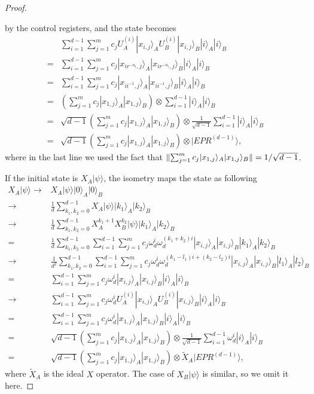 \documentclass[11pt,letterpaper]{article}
\newcommand{\ket}[1]{|#1\rangle}
\newcommand{\x}{\otimes}
\DeclarePairedDelimiter{\norm}{\lVert}{\rVert}
\newcommand{\1}{\mathbb{1}}
\newcommand{\EPR}[1]{EPR^{(#1)}}
\newcommand{\tX}{\tilde{X}}
\theoremstyle{definition}
\begin{document}
\begin{proof}
\begin{enumerate}
	by the control registers, and the state becomes
	\begin{align}
		&\sum_{i=1}^{d-1}\sum_{j=1}^m c_j U_A^{(i)}\ket{x_{i,j}}_A U_B^{(i)}\ket{x_{i,j}}_B \ket{i}_A\ket{i}_B \\
		=&\sum_{i=1}^{d-1} \sum_{j=1}^m c_j \ket{x_{i r^{-n_i} ,j}}_A \ket{x_{i r^{-n_i},j}}_B \ket{i}_A\ket{i}_B\\
		=& \sum_{i=1}^{d-1} \sum_{j=1}^m c_j \ket{x_{i i^{-1},j}}_A \ket{x_{i i^{-1},j}}_B \ket{i}_A\ket{i}_B\\
		= &\left(\sum_{j=1}^m c_j \ket{x_{1,j}}_A \ket{x_{1,j}}_B\right) \x \sum_{i=1}^{d-1} \ket{i}_A\ket{i}_B\\
		=&\sqrt{d-1} \left(\sum_{j=1}^m c_j \ket{x_{1,j}}_A \ket{x_{1,j}}_B\right) \x 
		\frac{1}{\sqrt{d-1}}\sum_{i=1}^{d-1}\ket{i}_A\ket{i}_B\\
		=&\sqrt{d-1} \left(\sum_{j=1}^m c_j \ket{x_{1,j}}_A \ket{x_{1,j}}_B\right) \x \ket{\EPR{d-1}},
	\end{align}
	where in the last line we used the fact that $\norm{\sum_{j=1}^m c_j \ket{x_{1,j}}_A \ket{x_{1,j}}_B} = 1/\sqrt{d-1}$.
\end{enumerate}

If the initial state is $X_A\ket{\psi}$, the isometry maps the state as following
\begin{align}
	X_A\ket{\psi} \to &X_A\ket{\psi}\ket{0}_A\ket{0}_B\\
	\to &\frac{1}{d} \sum_{k_1,k_2 =0}^{d-1} X_A\ket{\psi} \ket{k_1}_A \ket{k_2}_B \\
	\to &\frac{1}{d} \sum_{k_1,k_2 =0}^{d-1} X_A^{k_1+1} X_B^{k_2}\ket{\psi} \ket{k_1}_A \ket{k_2}_B \\
	=&\frac{1}{d} \sum_{k_1,k_2 =0}^{d-1} \sum_{i=1}^{d-1}\sum_{j=1}^m c_j \omega_d^i\omega_d^{(k_1+k_2)i} \ket{x_{i,j}}_A\ket{x_{i,j}}_B
		\ket{k_1}_A \ket{k_2}_B\\
	\to &\frac{1}{d^2}\sum_{k_1,k_2 =0}^{d-1} \sum_{i=1}^{d-1}\sum_{j=1}^m c_j \omega_d^i\omega_d^{(k_1-l_1)i+(k_2-l_2)i} \ket{x_{i,j}}_A\ket{x_{i,j}}_B
		\ket{l_1}_A \ket{l_2}_B\\
	=&\sum_{i=1}^{d-1}\sum_{j=1}^m c_j \omega_d^i \ket{x_{i,j}}_A\ket{x_{i,j}}_B \ket{i}_A \ket{i}_B\\
	\to& \sum_{i=1}^{d-1}\sum_{j=1}^m c_j \omega_d^i U_A^{(i)}\ket{x_{i,j}}_A U_B^{(i)}\ket{x_{i,j}}_B \ket{i}_A\ket{i}_B\\
	=&\sum_{i=1}^{d-1}\sum_{j=1}^m c_j \omega_d^i \ket{x_{1,j}}_A \ket{x_{1,j}}_B \ket{i}_A\ket{i}_B\\
	=&\sqrt{d-1} \left(\sum_{j=1}^m c_j \ket{x_{1,j}}_A \ket{x_{1,j}}_B\right) \x 
		\frac{1}{\sqrt{d-1}} \sum_{i=1}^{d-1}\omega_d^i \ket{i}_A\ket{i}_B\\
	=& \sqrt{d-1} \left(\sum_{j=1}^m c_j \ket{x_{1,j}}_A \ket{x_{1,j}}_B\right) \x \tX_A \ket{\EPR{d-1}},
\end{align}
where $\tX_A$ is the ideal $X$ operator.
The case of $X_B\ket{\psi}$ is similar, so we omit it here. 


\end{proof}
\end{document}
